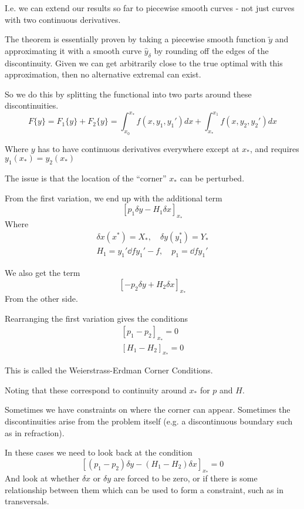 \documentclass{E:/Documents/Latex/myassignment}
\begin{document}
I.e. we can extend our results so far to piecewise smooth curves - not just curves with two continuous derivatives.


The theorem is essentially proven by taking a piecewise smooth function $\tilde{y}$ and approximating it with a smooth curve $\hat{y}_\delta$ by rounding off the edges of the discontinuity.
Given we can get arbitrarily close to the true optimal with this approximation, then no alternative extremal can exist.


So we do this by splitting the functional into two parts around these discontinuities.
\[F\{y\} = F_1\{y\} + F_2\{y\} = \int_{x_0}^{x_*} f(x,y_1,y_1')dx  + \int_{x_*}^{x_1} f(x,y_2,y_2') dx\]

Where $y$ has to have continuous derivatives everywhere except at $x_*$, and requires $y_1(x_*) = y_2(x_*)$

The issue is that the location of the ``corner'' $x_*$ can be perturbed.


From the first variation, we end up with the additional term
\[\left[p_1 \delta y - H_1 \delta x\right]_{x_*}\]
Where
\begin{align*}
	\delta x(x^*) = X_*, \quad \delta y(y_1^*) = Y_*\\
	H_1 = y_1' \dd f{y_1'} - f, \quad p_1 = \dd{f}{y_1'}
\end{align*}

We also get the term
\[\left[-p_2 \delta y + H_2 \delta x\right]_{x_*}\]
From the other side.


Rearranging the first variation gives the conditions
\begin{align*}
	\left[p_1 - p_2\right]_{x_*} = 0\\
	\left[H_1 - H_2\right]_{x_*} = 0
\end{align*}

This is called the Weierstrass-Erdman Corner Conditions.

Noting that these correspond to continuity around $x_*$ for $p$ and $H$.



Sometimes we have constraints on where the corner can appear. Sometimes the discontinuities arise from the problem itself (e.g. a discontinuous boundary such as in refraction).

In these cases we need to look back at the condition
\[\left[(p_1 - p_2) \delta y - (H_1 - H_2) \delta x\right]_{x_*} = 0\]
And look at whether $\delta x$ or $\delta y$ are forced to be zero, or if there is some relationship between them which can be used to form a constraint, such as in transversals.
\end{document}
